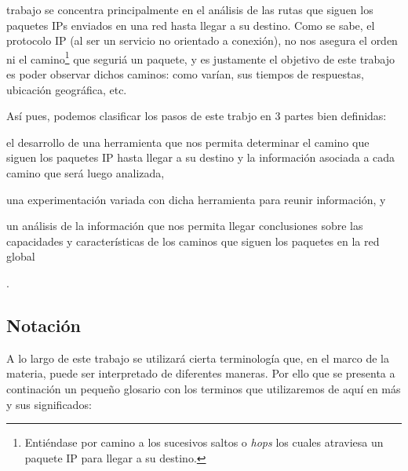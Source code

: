 trabajo se concentra principalmente en el an\'alisis
de las rutas que siguen los paquetes IPs enviados en una red hasta llegar a
su destino. Como se sabe, el protocolo IP (al ser un servicio no orientado
a conexi\'on), no nos asegura el orden ni el camino\footnote{Enti\'endase
por camino a los sucesivos saltos o \textit{hops}\cite{hop} los cuales
atraviesa un paquete IP para llegar a su destino.} que seguri\'a un paquete,
y es justamente el objetivo de este trabajo es poder observar dichos caminos:
como var\'ian, sus tiempos de respuestas, ubicaci\'on geogr\'afica, etc.

\par As\'i pues, podemos clasificar los pasos de este trabjo en 3 partes
bien definidas:
\begin{enumerate*}[label=\itshape\alph*\upshape)]
    \item el desarrollo de una herramienta que nos permita determinar el
        camino que siguen los paquetes IP hasta llegar a su destino y la
        informaci\'on asociada a cada camino que ser\'a luego analizada, 

    \item una experimentaci\'on variada con dicha herramienta para reunir
        informaci\'on, y

    \item un an\'alisis de la informaci\'on que nos permita llegar conclusiones
        sobre las capacidades y caracter\'isticas de los caminos que siguen
        los paquetes en la red global
\end{enumerate*}.


\subsection*{Notaci\'on}\label{sec:notacion}
\par A lo largo de este trabajo se utilizar\'a cierta terminolog\'ia que,
en el marco de la materia, puede ser interpretado de diferentes maneras. Por
ello que se presenta a continaci\'on un peque\~no glosario con los
terminos que utilizaremos de aqu\'i en m\'as y sus significados:

\bigskip

